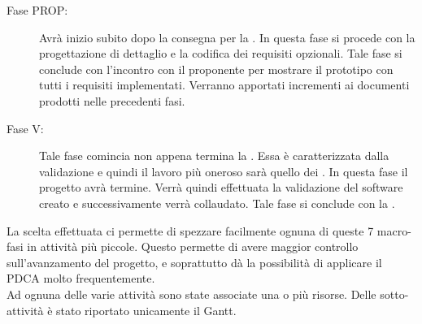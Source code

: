 \begin{description}
			\item[Fase PROP:] Avrà inizio subito dopo la consegna per la . In questa fase si procede con la progettazione di dettaglio e la codifica dei requisiti opzionali. Tale fase si conclude con l'incontro con il proponente per mostrare il prototipo con tutti i requisiti implementati. Verranno apportati incrementi ai documenti prodotti nelle precedenti fasi.
			\item[Fase V:] Tale fase comincia non appena termina la . Essa è caratterizzata dalla validazione e quindi il lavoro più oneroso sarà quello dei . In questa fase il progetto avrà termine. Verrà quindi effettuata la validazione del software creato e successivamente verrà collaudato. Tale fase si conclude con la .
		\end{description}
		La scelta effettuata ci permette di spezzare facilmente ognuna di queste 7 macro-fasi in attività più piccole. Questo permette di avere maggior controllo sull'avanzamento del progetto, e soprattutto dà la possibilità di applicare il PDCA molto frequentemente.\\Ad ognuna delle varie attività sono state associate una o più risorse. Delle sotto-attività è stato riportato unicamente il Gantt.
